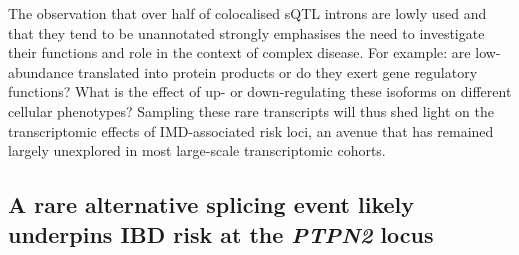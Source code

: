 The observation that over half of colocalised sQTL introns are lowly used and that they tend to be unannotated strongly emphasises the need to investigate their functions and role in the context of complex disease. For example: are low-abundance translated into protein products or do they exert gene regulatory functions? What is the effect of up- or down-regulating these isoforms on different cellular phenotypes? Sampling these rare transcripts will thus shed light on the transcriptomic effects of IMD-associated risk loci, an avenue that has remained largely unexplored in most large-scale transcriptomic cohorts. \\
\subsection{A rare alternative splicing event likely underpins IBD risk at the \textit{PTPN2} locus}

